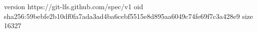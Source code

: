 version https://git-lfs.github.com/spec/v1
oid sha256:59bebfe2b10df0fa7ada3ad4ba6cebf5515e8d895aa6049c74fe69f7c3a428e9
size 16327
